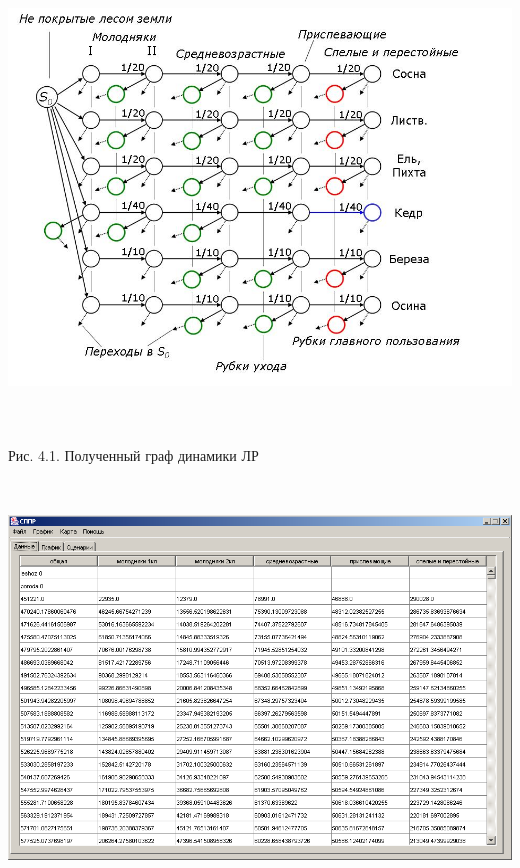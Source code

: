 \documentclass{article}
\begin{document}
\begin{center}
\includegraphics[width=490pt, height=346pt, keepaspectratio=true]{asyaDisser9_3-fig012.png}

Рис. 4.1. Полученный граф динамики ЛР

\includegraphics[width=449pt, height=312pt, keepaspectratio=true]{asyaDisser9_3-fig013.png}


\end{center}
\end{document}
